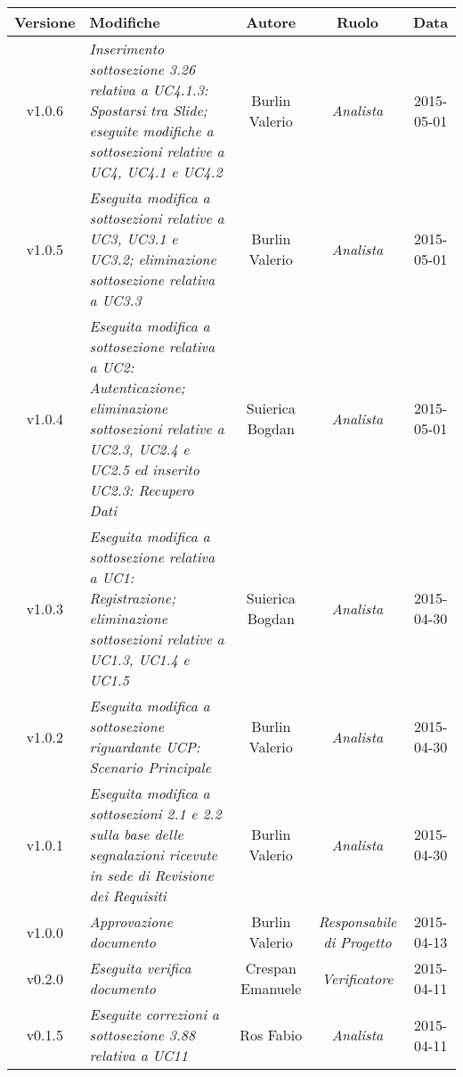 \newpage
\begin{table}[h]
\centering
\begin{tabular}{|c|p{}|c|c|c|}
	\toprule
		\textbf{Versione} & \textbf{Modifiche} & \textbf{Autore} & \textbf{Ruolo} & \textbf{Data}\\
	\midrule
	\midrule
		v1.0.6 & \textit{Inserimento sottosezione 3.26 relativa a UC4.1.3: Spostarsi tra Slide; eseguite modifiche a sottosezioni relative a UC4, UC4.1 e UC4.2} & Burlin Valerio & \textit{Analista} & 2015-05-01\\
	\midrule
		v1.0.5 & \textit{Eseguita modifica a sottosezioni relative a UC3, UC3.1 e UC3.2; eliminazione sottosezione relativa a UC3.3} & Burlin Valerio & \textit{Analista} & 2015-05-01\\
	\midrule
		v1.0.4 & \textit{Eseguita modifica a sottosezione relativa a UC2: Autenticazione; eliminazione sottosezioni relative a UC2.3, UC2.4 e UC2.5 ed inserito UC2.3: Recupero Dati} & Suierica Bogdan & \textit{Analista} & 2015-05-01\\
	\midrule
		v1.0.3 & \textit{Eseguita modifica a sottosezione relativa a UC1: Registrazione; eliminazione sottosezioni relative a UC1.3, UC1.4 e UC1.5} & Suierica Bogdan & \textit{Analista} & 2015-04-30\\
	\midrule
		v1.0.2 & \textit{Eseguita modifica a sottosezione riguardante UCP: Scenario Principale} & Burlin Valerio & \textit{Analista} & 2015-04-30\\
	\midrule
		v1.0.1 & \textit{Eseguita modifica a sottosezioni 2.1 e 2.2 sulla base delle segnalazioni ricevute in sede di Revisione dei Requisiti} & Burlin Valerio & \textit{Analista} & 2015-04-30\\
	\midrule
		v1.0.0 & \textit{Approvazione documento} & Burlin Valerio & \textit{Responsabile di Progetto} & 2015-04-13\\
	\midrule
		v0.2.0 & \textit{Eseguita verifica documento} & Crespan Emanuele & \textit{Verificatore} & 2015-04-11\\
	\midrule
		v0.1.5 & \textit{Eseguite correzioni a sottosezione 3.88 relativa a UC11} & Ros Fabio & \textit{Analista} & 2015-04-11\\
	\bottomrule
\end{tabular}
\end{table}
\newpage
